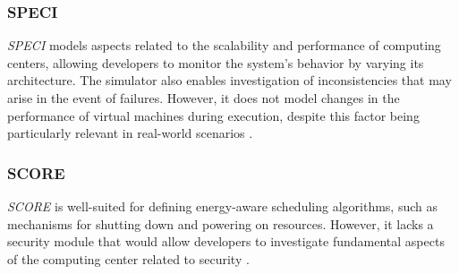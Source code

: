 {\subsubsection*{SPECI}
\emph{SPECI} \cite{sriram2009speci} models aspects related to the scalability and performance of computing centers, allowing developers to monitor the system's behavior by varying its architecture. The simulator also enables investigation of inconsistencies that may arise in the event of failures. However, it does not model changes in the performance of virtual machines during execution, despite this factor being particularly relevant in real-world scenarios \cite{mansouri2020cloud}.

\subsubsection*{SCORE}
\emph{SCORE} \cite{fernandez2018score} is well-suited for defining energy-aware scheduling algorithms, such as mechanisms for shutting down and powering on resources. However, it lacks a security module that would allow developers to investigate fundamental aspects of the computing center related to security \cite{mansouri2020cloud}.


}
